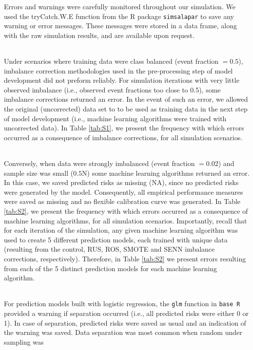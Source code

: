 \documentclass[
]{article}
\begin{document}
Errors and warnings were carefully monitored throughout our simulation.
We used the tryCatch.W.E function from the R package \texttt{simsalapar}
to save any warning or error messages. These messages were stored in a
data frame, along with the raw simulation results, and are available
upon request.\\
\strut \\
Under scenarios where training data were class balanced (event fraction
\(= 0.5\)), imbalance correction methodologies used in the
pre-processing step of model development did not preform reliably. For
simulation iterations with very little observed imbalance (i.e.,
observed event fractions too close to 0.5), some imbalance corrections
returned an error. In the event of such an error, we allowed the
original (uncorrected) data set to to be used as training data in the
next step of model development (i.e., machine learning algorithms were
trained with uncorrected data). In Table \ref{tab:S1}, we present the
frequency with which errors occurred as a consequence of imbalance
corrections, for all simulation scenarios.\\
\strut \\
Conversely, when data were strongly imbalanced (event fraction
\(= 0.02\)) and sample size was small (\(0.5\)N) some machine learning
algorithms returned an error. In this case, we saved predicted risks as
missing (NA), since no predicted risks were generated by the model.
Consequently, all empirical performance measures were saved as missing
and no flexible calibration curve was generated. In Table \ref{tab:S2},
we present the frequency with which errors occurred as a consequence of
machine learning algorithms, for all simulation scenarios. Importantly,
recall that for each iteration of the simulation, any given machine
learning algorithm was used to create 5 different prediction models,
each trained with unique data (resulting from the control, RUS, ROS,
SMOTE and SENN imbalance corrections, respectively). Therefore, in Table
\ref{tab:S2} we present errors resulting from each of the 5 distinct
prediction models for each machine learning algorithm.\\
\strut \\
For prediction models built with logistic regression, the \texttt{glm}
function in \texttt{base\ R} provided a warning if separation occurred
(i.e., all predicted risks were either 0 or 1). In case of separation,
predicted risks were saved as usual and an indication of the warning was
saved. Data separation was most common when random under sampling was
\end{document}
